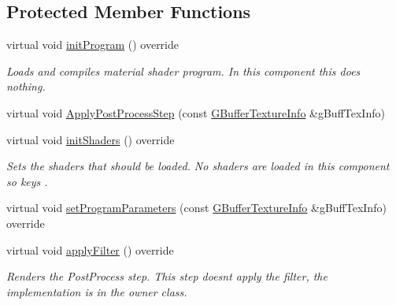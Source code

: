 \subsection*{Protected Member Functions}
\begin{DoxyCompactItemize}
\item 
\mbox{\label{class_geometry_engine_1_1_custom_shading_1_1_call_second_step_a1a61abc2a9169bf812695ee553fd4688}} 
virtual void \mbox{\hyperlink{class_geometry_engine_1_1_custom_shading_1_1_call_second_step_a1a61abc2a9169bf812695ee553fd4688}{init\+Program}} () override
\begin{DoxyCompactList}\small\item\em Loads and compiles material shader program. In this component this does nothing. \end{DoxyCompactList}\item 
virtual void \mbox{\hyperlink{class_geometry_engine_1_1_custom_shading_1_1_call_second_step_af671ca1fc8a0aa5e35309603ddb7da19}{Apply\+Post\+Process\+Step}} (const \mbox{\hyperlink{class_geometry_engine_1_1_g_buffer_texture_info}{G\+Buffer\+Texture\+Info}} \&g\+Buff\+Tex\+Info)
\item 
\mbox{\label{class_geometry_engine_1_1_custom_shading_1_1_call_second_step_a7b6f5cb6484bcf6d82ab25495f84213a}} 
virtual void \mbox{\hyperlink{class_geometry_engine_1_1_custom_shading_1_1_call_second_step_a7b6f5cb6484bcf6d82ab25495f84213a}{init\+Shaders}} () override
\begin{DoxyCompactList}\small\item\em Sets the shaders that should be loaded. No shaders are loaded in this component so keys . \end{DoxyCompactList}\item 
virtual void \mbox{\hyperlink{class_geometry_engine_1_1_custom_shading_1_1_call_second_step_a31dfe9d64b6d938367f2adeecc1d37bb}{set\+Program\+Parameters}} (const \mbox{\hyperlink{class_geometry_engine_1_1_g_buffer_texture_info}{G\+Buffer\+Texture\+Info}} \&g\+Buff\+Tex\+Info) override
\item 
\mbox{\label{class_geometry_engine_1_1_custom_shading_1_1_call_second_step_a0c3cdda08caa73c82353e4a011676d6b}} 
virtual void \mbox{\hyperlink{class_geometry_engine_1_1_custom_shading_1_1_call_second_step_a0c3cdda08caa73c82353e4a011676d6b}{apply\+Filter}} () override
\begin{DoxyCompactList}\small\item\em Renders the Post\+Process step. This step doesn\textquotesingle{}t apply the filter, the implementation is in the owner class. \end{DoxyCompactList}\end{DoxyCompactItemize}
